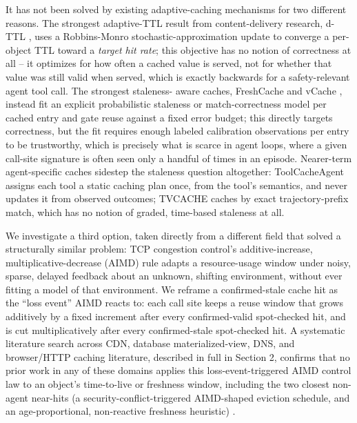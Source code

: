 \documentclass[11pt,letterpaper]{article}
\begin{document}
It has not been solved by existing adaptive-caching mechanisms for two different reasons. The strongest
adaptive-TTL result from content-delivery research, d-TTL \citep{Basu2017}, uses a Robbins-Monro stochastic-approximation
update to converge a per-object TTL toward a \emph{target hit rate}; this objective has no notion of correctness
at all -- it optimizes for how often a cached value is served, not for whether that value was still valid
when served, which is exactly backwards for a safety-relevant agent tool call. The strongest staleness-
aware caches, FreshCache \citep{Mansoor2026} and vCache \citep{Schroeder2025}, instead fit an explicit probabilistic staleness or
match-correctness model per cached entry and gate reuse against a fixed error budget; this directly targets
correctness, but the fit requires enough labeled calibration observations per entry to be trustworthy,
which is precisely what is scarce in agent loops, where a given call-site signature is often seen only a
handful of times in an episode. Nearer-term agent-specific caches sidestep the staleness question
altogether: ToolCacheAgent \citep{ToolCacheAgent2026} assigns each tool a static caching plan once, from the tool's semantics, and
never updates it from observed outcomes; TVCACHE \citep{Kumar2026} caches by exact trajectory-prefix match, which has no
notion of graded, time-based staleness at all.

We investigate a third option, taken directly from a different field that solved a structurally similar
problem: TCP congestion control's additive-increase, multiplicative-decrease (AIMD) rule \citep{Jacobson1988,Chiu1989} adapts a
resource-usage window under noisy, sparse, delayed feedback about an unknown, shifting environment, without
ever fitting a model of that environment. We reframe a confirmed-stale cache hit as the ``loss event'' AIMD
reacts to: each call site keeps a reuse window that grows additively by a fixed increment after every
confirmed-valid spot-checked hit, and is cut multiplicatively after every confirmed-stale spot-checked hit.
A systematic literature search across CDN, database materialized-view, DNS, and browser/HTTP caching
literature, described in full in Section 2, confirms that no prior work in any of these domains applies
this loss-event-triggered AIMD control law to an object's time-to-live or freshness window, including the
two closest non-agent near-hits (a security-conflict-triggered AIMD-shaped eviction schedule, and an
age-proportional, non-reactive freshness heuristic) \citep{Thoma2023,Cate1992,Fielding2014}.
\end{document}
